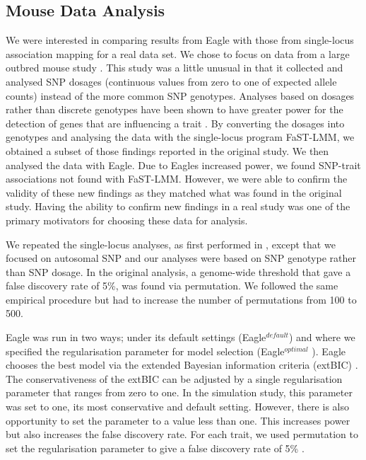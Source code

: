\documentclass{nature}
\begin{document}
\subsection{Mouse Data Analysis}


We were interested in comparing results from Eagle with those from single-locus association mapping for a real data set.
 We chose to focus on data from a large outbred mouse study \cite{nicod2016genome}. This study was a little unusual in that it collected and analysed SNP dosages (continuous values from zero to one of expected allele counts)  instead of the more common SNP genotypes. Analyses based on dosages rather than discrete genotypes have been shown to have greater power for the detection of genes that are influencing a trait  \cite{zheng2011comparison}. By converting the dosages into genotypes and analysing the data with the single-locus program FaST-LMM, we obtained a subset of those findings reported in the original study. We then analysed the data with Eagle. Due to Eagles increased power, we found SNP-trait associations not found with  FaST-LMM. However, we were 
 able to confirm the validity of these new findings as they matched what was found in the original study. Having the ability to confirm new findings  in a real study was 
 one of the primary motivators for choosing these data for analysis. 

We repeated the single-locus analyses, as first performed in \cite{nicod2016genome}, except 
that we focused on autosomal SNP and our analyses were based on SNP genotype  rather than SNP dosage. 
In the original analysis, a genome-wide threshold that gave a false discovery rate of 5\%, was found via permutation. We followed the 
same empirical procedure but had to increase the number of permutations from 100 to 500. 

Eagle was run in two ways; under its default settings (Eagle$^{default}$) and where we specified the regularisation parameter for model selection (Eagle$^{optimal}$ ). Eagle chooses the best model via the extended Bayesian information criteria (extBIC) \cite{chen2008extended}. 
  The conservativeness of the extBIC can be adjusted by a single regularisation parameter that ranges from zero to one. In the simulation study, this parameter was set to one, its most conservative and default setting. However, there is also opportunity to set the parameter to a value less than one. This increases power but also increases the false discovery rate. For each trait, we used permutation to set the regularisation parameter to give a false discovery rate of 5\% .
\end{document}
